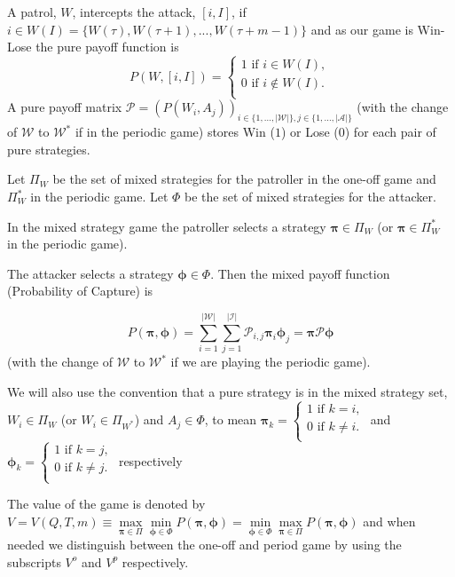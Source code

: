 \documentclass[a4paper,10pt]{article}
\theoremstyle{definition}
\theoremstyle{definition}
\theoremstyle{remark}
\theoremstyle{definition}
\begin{document}
A patrol, $W$, intercepts the attack, $[i,I]$, if $i \in W(I)=\{W(\tau),W(\tau+1),...,W(\tau+m-1)\}$ and as our game is Win-Lose the pure payoff function is
$$P(W,[i,I])=\left\{ \begin{array}{l}
1 \text{  if  } i \in W(I) ,\\
0 \text{  if  } i \notin W(I) .\\
\end{array}\right.$$
A pure payoff matrix $\mathcal{P}=(P(W_{i},A_{j}))_{i \in \{ 1,...,|\mathcal{W}| \}, j \in \{ 1,...,|\mathcal{A}| \}}$ (with the change of $\mathcal{W}$ to $\mathcal{W}^*$ if in the periodic game) stores Win ($1$) or Lose ($0$) for each pair of pure strategies.

Let $\Pi_{W}$ be the set of mixed strategies for the patroller in the one-off game and $\Pi_{W}^*$ in the periodic game. Let $\Phi$ be the set of mixed strategies for the attacker.

In the mixed strategy game the patroller selects a strategy $\bm{\pi} \in \Pi_{W}$ (or $\bm{\pi}  \in \Pi_{W}^*$ in the periodic game).

The attacker selects a strategy $\bm{\phi} \in \Phi$. Then the mixed payoff function (Probability of Capture) is

$$
P(\bm{\pi} ,\bm{\phi})=\sum\limits_{i=1}^{|\mathcal{W}|} \sum\limits_{j=1}^{|\mathcal{I}|} \mathcal{P}_{i,j} \bm{\pi} _{i} \bm{\phi}_{j}
=\bm{\pi} \mathcal{P} \bm{\phi}
$$
(with the change of $\mathcal{W}$ to $\mathcal{W}^*$ if we are playing the periodic game).

We will also use the convention that a pure strategy is in the mixed strategy set, $W_{i} \in \Pi_{W}$ (or $W_{i} \in \Pi_{W^*}$) and $A_{j} \in \Phi$, to mean $\bm{\pi}_{k}=\left\{\begin{array}{c}
1 \text{ if } k=i, \\
0 \text{ if } k \neq i. \\
\end{array} \right.$
and
$\bm{\phi}_{k}=\left\{\begin{array}{c}
1 \text{ if } k=j, \\
0 \text{ if } k \neq j. \\
\end{array} \right.$ respectively

The value of the game is denoted by $V=V(Q,T,m) \equiv \max\limits_{\bm{\pi} \in \Pi} \min\limits_{\bm{\phi} \in \Phi} P(\bm{\pi},\bm{\phi})=\min\limits_{\bm{\phi} \in \Phi} \max\limits_{\bm{\pi} \in \Pi} P(\bm{\pi},\bm{\phi})$ and when needed we distinguish between the one-off and period game by using the subscripts $V^{o}$ and $V^p$ respectively.
\end{document}
